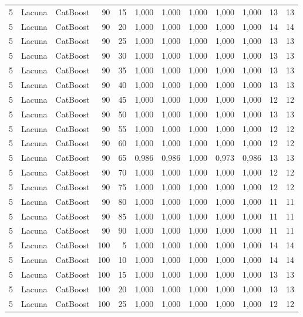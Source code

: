 \begin{longtable}{@{}rllrrrrrrrrr@{}}
5 & Lacuna & CatBoost & 90 & 15 & 1,000 & 1,000 & 1,000 & 1,000 & 1,000 & 13 & 13 \\
5 & Lacuna & CatBoost & 90 & 20 & 1,000 & 1,000 & 1,000 & 1,000 & 1,000 & 14 & 14 \\
5 & Lacuna & CatBoost & 90 & 25 & 1,000 & 1,000 & 1,000 & 1,000 & 1,000 & 13 & 13 \\
5 & Lacuna & CatBoost & 90 & 30 & 1,000 & 1,000 & 1,000 & 1,000 & 1,000 & 13 & 13 \\
5 & Lacuna & CatBoost & 90 & 35 & 1,000 & 1,000 & 1,000 & 1,000 & 1,000 & 13 & 13 \\
5 & Lacuna & CatBoost & 90 & 40 & 1,000 & 1,000 & 1,000 & 1,000 & 1,000 & 13 & 13 \\
5 & Lacuna & CatBoost & 90 & 45 & 1,000 & 1,000 & 1,000 & 1,000 & 1,000 & 12 & 12 \\
5 & Lacuna & CatBoost & 90 & 50 & 1,000 & 1,000 & 1,000 & 1,000 & 1,000 & 13 & 13 \\
5 & Lacuna & CatBoost & 90 & 55 & 1,000 & 1,000 & 1,000 & 1,000 & 1,000 & 12 & 12 \\
5 & Lacuna & CatBoost & 90 & 60 & 1,000 & 1,000 & 1,000 & 1,000 & 1,000 & 12 & 12 \\
5 & Lacuna & CatBoost & 90 & 65 & 0,986 & 0,986 & 1,000 & 0,973 & 0,986 & 13 & 13 \\
5 & Lacuna & CatBoost & 90 & 70 & 1,000 & 1,000 & 1,000 & 1,000 & 1,000 & 12 & 12 \\
5 & Lacuna & CatBoost & 90 & 75 & 1,000 & 1,000 & 1,000 & 1,000 & 1,000 & 12 & 12 \\
5 & Lacuna & CatBoost & 90 & 80 & 1,000 & 1,000 & 1,000 & 1,000 & 1,000 & 11 & 11 \\
5 & Lacuna & CatBoost & 90 & 85 & 1,000 & 1,000 & 1,000 & 1,000 & 1,000 & 11 & 11 \\
5 & Lacuna & CatBoost & 90 & 90 & 1,000 & 1,000 & 1,000 & 1,000 & 1,000 & 11 & 11 \\
5 & Lacuna & CatBoost & 100 & 5 & 1,000 & 1,000 & 1,000 & 1,000 & 1,000 & 14 & 14 \\
5 & Lacuna & CatBoost & 100 & 10 & 1,000 & 1,000 & 1,000 & 1,000 & 1,000 & 14 & 14 \\
5 & Lacuna & CatBoost & 100 & 15 & 1,000 & 1,000 & 1,000 & 1,000 & 1,000 & 13 & 13 \\
5 & Lacuna & CatBoost & 100 & 20 & 1,000 & 1,000 & 1,000 & 1,000 & 1,000 & 13 & 13 \\
5 & Lacuna & CatBoost & 100 & 25 & 1,000 & 1,000 & 1,000 & 1,000 & 1,000 & 12 & 12 \\

\end{longtable}
